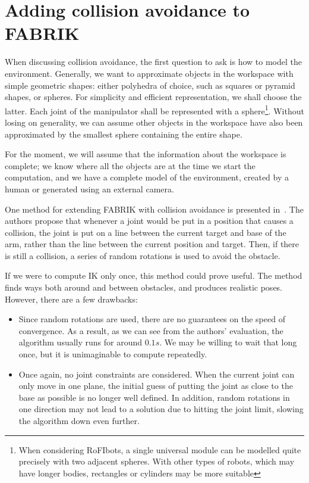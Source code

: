 \clearpage

\section{Adding collision avoidance to FABRIK}

When discussing collision avoidance, the first question to ask is how to model the environment. Generally, we want to approximate objects in the workspace with simple geometric shapes: either polyhedra of choice, such as squares or pyramid shapes, or spheres. For simplicity and efficient representation, we shall choose the latter. Each joint of the manipulator shall be represented with a sphere\footnote{When considering RoFIbots, a single universal module can be modelled quite precisely with two adjacent spheres. With other types of robots, which may have longer bodies, rectangles or cylinders may be more suitable}. Without losing on generality, we can assume other objects in the workspace have also been approximated by the smallest sphere containing the entire shape.

For the moment, we will assume that the information about the workspace is complete; we know where all the objects are at the time we start the computation, and we have a complete model of the environment, created by a human or generated using an external camera.

One method for extending FABRIK with collision avoidance is presented in~\cite{fabrikAvoidance}. The authors propose that whenever a joint would be put in a position that causes a collision, the joint is put on a line between the current target and base of the arm, rather than the line between the current position and target. Then, if there is still a collision, a series of random rotations is used to avoid the obstacle.

If we were to compute IK only once, this method could prove useful. The method finds ways both around and between obstacles, and produces realistic poses. However, there are a few drawbacks:

\begin{itemize}
\item Since random rotations are used, there are no guarantees on the speed of convergence. As a result, as we can see from the authors' evaluation, the algorithm usually runs for around $0.1s$. We may be willing to wait that long once, but it is unimaginable to compute repeatedly.
\item Once again, no joint constraints are considered. When the current joint can only move in one plane, the initial guess of putting the joint as close to the base as possible is no longer well defined. In addition, random rotations in one direction may not lead to a solution due to hitting the joint limit, slowing the algorithm down even further.
\end{itemize}

